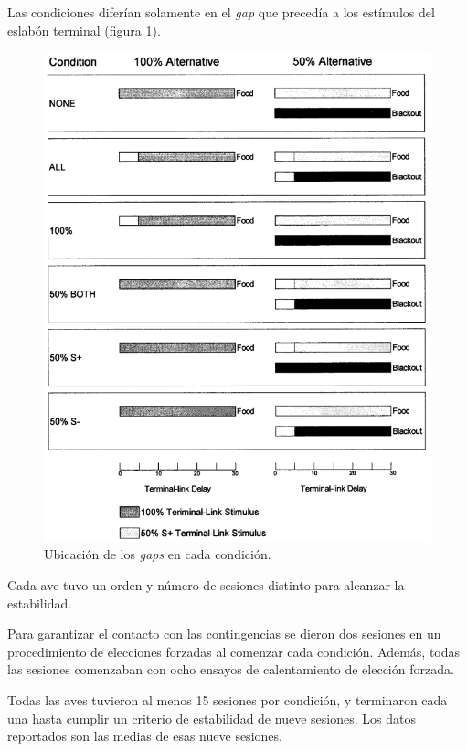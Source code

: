 \documentclass[a4paper,12pt]{article}
\begin{document}
Las condiciones diferían solamente en el {\itshape gap} que precedía a los estímulos del eslabón terminal (figura 1).

\begin{figure}[ht]
        \begin{center}
                \includegraphics[scale=0.5]{McDevitt1997(1).png}
                \caption{Ubicación de los {\itshape gaps} en cada condición.}
        \end{center}
\end{figure}

Cada ave tuvo un orden y número de sesiones distinto para alcanzar la estabilidad.

Para garantizar el contacto con las contingencias se dieron dos sesiones en un procedimiento de elecciones forzadas al comenzar cada condición.  Además, todas las sesiones comenzaban con ocho ensayos de calentamiento de elección forzada.

Todas las aves tuvieron al menos 15 sesiones por condición, y terminaron cada una hasta cumplir un criterio de estabilidad de nueve sesiones. Los datos reportados son las medias de esas nueve sesiones.
\end{document}
